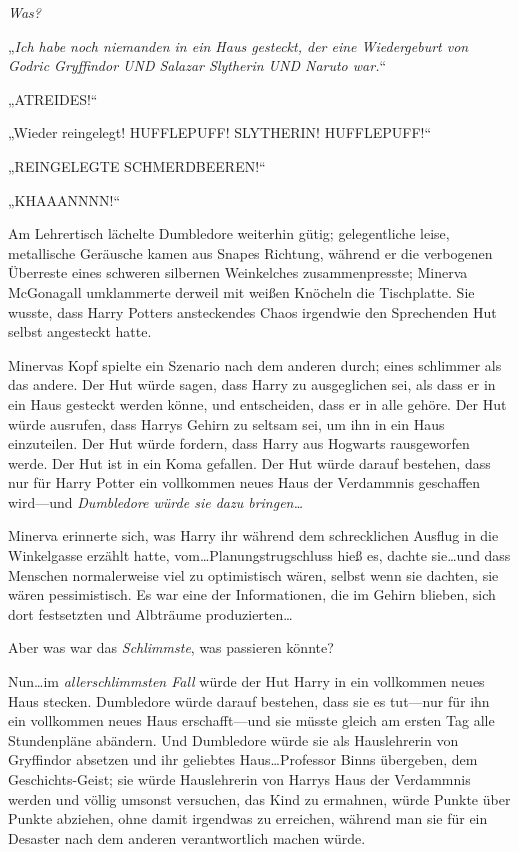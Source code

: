 \emph{Was?}

„\emph{Ich habe noch niemanden in ein Haus gesteckt, der eine Wiedergeburt von Godric Gryffindor UND Salazar Slytherin UND Naruto war.}“

\later

„ATREIDES!“

\later

„Wieder reingelegt! HUFFLEPUFF! SLYTHERIN! HUFFLEPUFF!“

\later

„REINGELEGTE SCHMERDBEEREN!“

\later

„KHAAANNNN!“

\later

Am Lehrertisch lächelte Dumbledore weiterhin gütig; gelegentliche leise, metallische Geräusche kamen aus Snapes Richtung, während er die verbogenen Überreste eines schweren silbernen Weinkelches zusammenpresste; Minerva McGonagall umklammerte derweil mit weißen Knöcheln die Tischplatte. Sie wusste, dass Harry Potters ansteckendes Chaos irgendwie den Sprechenden Hut selbst angesteckt hatte.

Minervas Kopf spielte ein Szenario nach dem anderen durch; eines schlimmer als das andere. Der Hut würde sagen, dass Harry zu ausgeglichen sei, als dass er in ein Haus gesteckt werden könne, und entscheiden, dass er in alle gehöre. Der Hut würde ausrufen, dass Harrys Gehirn zu seltsam sei, um ihn in ein Haus einzuteilen. Der Hut würde fordern, dass Harry aus Hogwarts rausgeworfen werde. Der Hut ist in ein Koma gefallen. Der Hut würde darauf bestehen, dass nur für Harry Potter ein vollkommen neues Haus der Verdammnis geschaffen wird—und \emph{Dumbledore würde sie dazu bringen…}

Minerva erinnerte sich, was Harry ihr während dem schrecklichen Ausflug in die Winkelgasse erzählt hatte, vom…Planungstrugschluss hieß es, dachte sie…und dass Menschen normalerweise viel zu optimistisch wären, selbst wenn sie dachten, sie wären pessimistisch. Es war eine der Informationen, die im Gehirn blieben, sich dort festsetzten und Albträume produzierten…

Aber was war das \emph{Schlimmste}, was passieren könnte?

Nun…im \emph{allerschlimmsten Fall} würde der Hut Harry in ein vollkommen neues Haus stecken. Dumbledore würde darauf bestehen, dass sie es tut—nur für ihn ein vollkommen neues Haus erschafft—und sie müsste gleich am ersten Tag alle Stundenpläne abändern. Und Dumbledore würde sie als Hauslehrerin von Gryffindor absetzen und ihr geliebtes Haus…Professor Binns übergeben, dem Geschichts-Geist; sie würde Hauslehrerin von Harrys Haus der Verdammnis werden und völlig umsonst versuchen, das Kind zu ermahnen, würde Punkte über Punkte abziehen, ohne damit irgendwas zu erreichen, während man sie für ein Desaster nach dem anderen verantwortlich machen würde.

